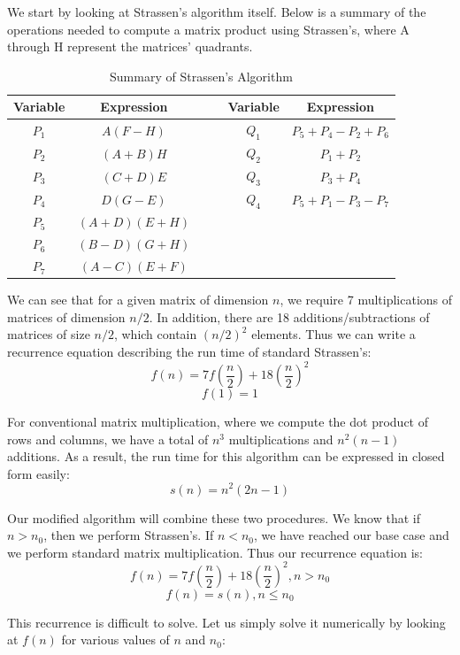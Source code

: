 \documentclass[12pt]{article}
\begin{document}
We start by looking at Strassen's algorithm itself. Below is a summary of the operations needed to compute a matrix product using Strassen's, where A through H represent the matrices' quadrants. \\

\begin{table}[h!]
\centering
{\setlength{\tabcolsep}{15pt}
\begin{tabular}{ c c c | c c c }
Variable & Expression &&& Variable & Expression\\ \hline
$P_1$ & $A(F-H)$ &&& $Q_1$ & $P_5+P_4-P_2+P_6$ \\
$P_2$ & $(A+B)H$ &&& $Q_2$ & $P_1+P_2$ \\
$P_3$ & $(C+D)E$ &&& $Q_3$ & $P_3+P_4$ \\
$P_4$ & $D(G-E)$ &&& $Q_4$ & $P_5+P_1-P_3-P_7$ \\
$P_5$ & $(A+D)(E+H)$ & \\
$P_6$ & $(B-D)(G+H)$ & \\
$P_7$ & $(A-C)(E+F)$ & \\
\end{tabular}}
\caption{Summary of Strassen's Algorithm
\label{T:Stra}}
\end{table}

We can see that for a given matrix of dimension $n$, we require 7 multiplications of matrices of dimension $n/2$. In addition, there are 18 additions/subtractions of matrices of size $n/2$, which contain $(n/2)^2$ elements. Thus we can write a recurrence equation describing the run time of standard Strassen's:
$$f(n) = 7f\left(\frac{n}{2}\right)+18\left(\frac{n}{2}\right)^2$$
$$f(1) = 1$$

For conventional matrix multiplication, where we compute the dot product of rows and columns, we have a total of $n^3$ multiplications and $n^2(n - 1)$ additions. As a result, the run time for this algorithm can be expressed in closed form easily:
$$s(n) = n^2(2n-1)$$

Our modified algorithm will combine these two procedures. We know that if $n > n_0$, then we perform Strassen's. If $n < n_0$, we have reached our base case and we perform standard matrix multiplication. Thus our recurrence equation is:
$$f(n) = 7f\left(\frac{n}{2}\right)+18\left(\frac{n}{2}\right)^2, n > n_0$$
$$f(n) = s(n), n \le n_0$$

This recurrence is difficult to solve. Let us simply solve it numerically by looking at $f(n)$ for various values of $n$ and $n_0$:
\end{document}
